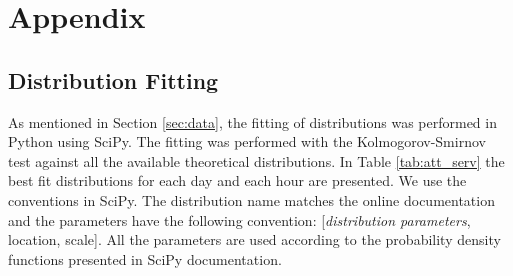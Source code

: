 \appendix
\section{Appendix}\label{sec:appen}
\subsection{Distribution Fitting}
As mentioned in Section \ref{sec:data}, the fitting of distributions was performed in Python using SciPy. The fitting was performed with the Kolmogorov-Smirnov test against all the available theoretical distributions. In Table \ref{tab:att_serv} the best fit distributions for each day and each hour are presented. We use the conventions in SciPy. The distribution name matches the online documentation and the parameters have the following convention: [\textit{distribution parameters}, location, scale]. All the parameters are used according to the probability density functions presented in SciPy documentation.


